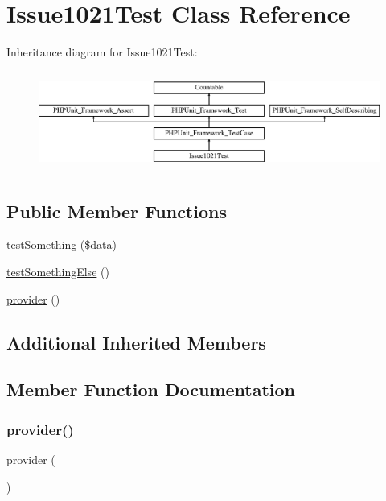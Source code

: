 \hypertarget{class_issue1021_test}{}\section{Issue1021\+Test Class Reference}
\label{class_issue1021_test}
Inheritance diagram for Issue1021\+Test\+:\begin{figure}[H]
\begin{center}
\leavevmode
\includegraphics[height=3.303835cm]{class_issue1021_test}
\end{center}
\end{figure}
\subsection*{Public Member Functions}
\begin{DoxyCompactItemize}
\item 
\mbox{\hyperlink{class_issue1021_test_aff40fc92b821163244ff44c1a9e41079}{test\+Something}} (\$data)
\item 
\mbox{\hyperlink{class_issue1021_test_abcb919247213405c5d20880827d2972d}{test\+Something\+Else}} ()
\item 
\mbox{\hyperlink{class_issue1021_test_a141540808e5970d27589425027e66cc9}{provider}} ()
\end{DoxyCompactItemize}
\subsection*{Additional Inherited Members}


\subsection{Member Function Documentation}
\mbox{\label{class_issue1021_test_a141540808e5970d27589425027e66cc9}} 
\subsubsection{\texorpdfstring{provider()}{provider()}}
{\footnotesize\ttfamily provider (\begin{DoxyParamCaption}{ }\end{DoxyParamCaption})}

